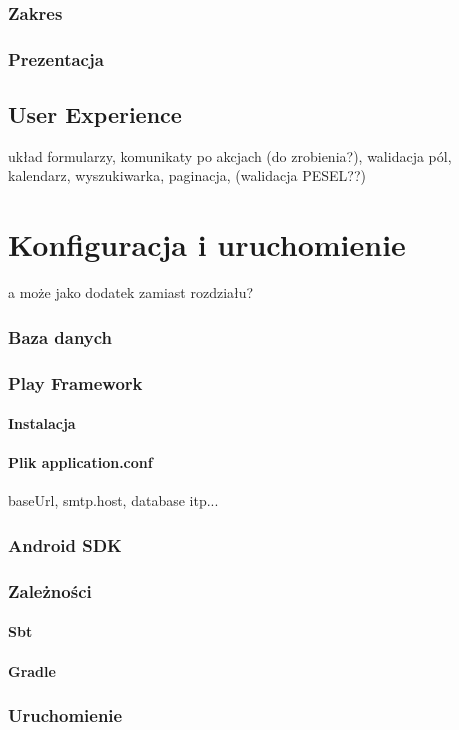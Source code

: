 \documentclass[11pt]{aghdpl}
\begin{document}
\subsection{Zakres}
\subsection{Prezentacja}
\section{User Experience}
układ formularzy, komunikaty po akcjach (do zrobienia?), walidacja pól, kalendarz, wyszukiwarka, paginacja, (walidacja PESEL??)

\chapter{Konfiguracja i uruchomienie}
\label{cha:konfiguracja_i_uruchomienie}
a może jako dodatek zamiast rozdziału?

\subsection{Baza danych}
\subsection{Play Framework}
\subsubsection{Instalacja}
\subsubsection{Plik application.conf}
baseUrl, smtp.host, database itp...
\subsection{Android SDK}
\subsection{Zależności}
\subsubsection{Sbt}
\subsubsection{Gradle}
\subsection{Uruchomienie}

% 
% 

\label{cha:bibliografia}



\end{document}

